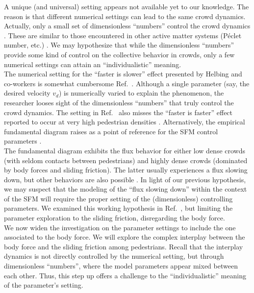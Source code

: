 \documentclass[preprint,12pt]{elsarticle}
\begin{document}
A unique (and universal) setting appears not available yet to
our knowledge. 
 The reason is that different numerical settings can lead to 
the same crowd dynamics. Actually, only a small set of dimensionless 
``numbers'' control the crowd dynamics \cite{dorso_2019}. These are similar to 
those encountered in other active matter systems (P\'eclet number, etc.)  
\cite{marchetti_2014}. We may hypothesize that while the dimensionless 
``numbers'' provide some kind of control on the 
collective behavior in 
crowds, only a few numerical settings can attain an ``individualistic'' 
meaning. 
 \\

The numerical setting for the ``faster is slower'' effect presented by 
Helbing and co-workers is somewhat cumbersome 
Ref.~\cite{helbing_2000,dorso_2017,dorso_2019}. Although a single 
parameter (say, the desired velocity $v_d$) is numerically varied to 
explain the phenomenon, the researcher looses sight of the dimensionless 
``numbers'' that truly control the crowd dynamics. The setting in 
Ref.~\cite{helbing_2000} also misses the ``faster is faster'' effect reported 
to occur at very high pedestrian densities \cite{dorso_2017,haghani_2019}. 
Alternatively, the empirical fundamental diagram raises as a point of reference 
for the SFM control parameters \cite{helbing_2007,dorso_2017}. \\

The fundamental diagram exhibits the flux behavior for either low dense crowds 
(with seldom contacts between pedestrians) and highly dense crowds (dominated 
by 
body forces and sliding friction). The latter usually experiences a flux 
slowing 
down, but other behaviors are also possible \cite{helbing_2007,lohner_2018}. In 
light of our previous hypothesis, we may suspect that the  modeling of the 
``flux slowing down'' within the context of the SFM will require the proper 
setting of the (dimensionless) controlling parameters. We examined this working 
hypothesis in Ref.~\cite{dorso_2019}, but limiting the parameter exploration to 
the sliding friction, disregarding the body force. \\

We now widen the investigation on the parameter settings to include the one 
associated to the body force. We will  explore 
 the complex interplay between 
the body force and the sliding friction among pedestrians. Recall that the 
interplay dynamics is not directly controlled by the numerical setting, but 
through dimensionless ``numbers'', where the model parameters appear mixed 
between each other. Thus, this step up offers a challenge to the 
``individualistic'' meaning of the parameter's setting. \\  
\end{document}
